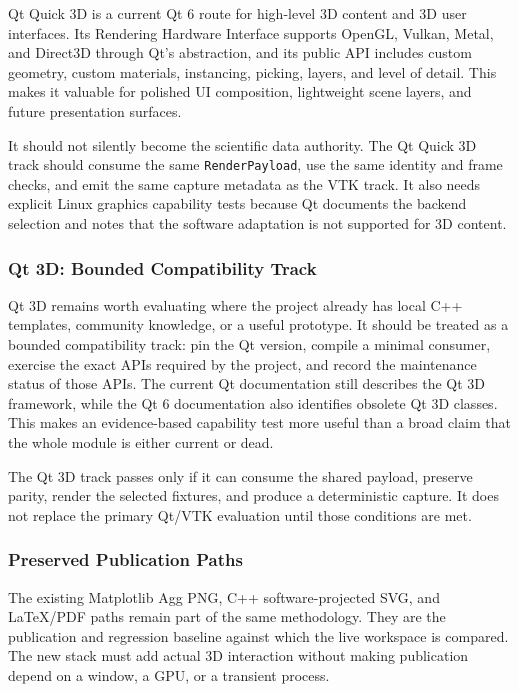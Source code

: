 \documentclass[11pt,a4paper]{article}
\begin{document}
Qt Quick 3D is a current Qt 6 route for high-level 3D content and 3D user
interfaces.  Its Rendering Hardware Interface supports OpenGL, Vulkan, Metal,
and Direct3D through Qt's abstraction, and its public API includes custom
geometry, custom materials, instancing, picking, layers, and level of detail.
This makes it valuable for polished UI composition, lightweight scene layers,
and future presentation surfaces.

It should not silently become the scientific data authority.  The Qt Quick 3D
track should consume the same \texttt{RenderPayload}, use the same identity and
frame checks, and emit the same capture metadata as the VTK track.  It also
needs explicit Linux graphics capability tests because Qt documents the
backend selection and notes that the software adaptation is not supported for
3D content.

\subsubsection{Qt 3D: Bounded Compatibility Track}

Qt 3D remains worth evaluating where the project already has local C++
templates, community knowledge, or a useful prototype.  It should be treated
as a bounded compatibility track: pin the Qt version, compile a minimal
consumer, exercise the exact APIs required by the project, and record the
maintenance status of those APIs.  The current Qt documentation still
describes the Qt 3D framework, while the Qt 6 documentation also identifies
obsolete Qt 3D classes.  This makes an evidence-based capability test more
useful than a broad claim that the whole module is either current or dead.

The Qt 3D track passes only if it can consume the shared payload, preserve
parity, render the selected fixtures, and produce a deterministic capture.  It
does not replace the primary Qt/VTK evaluation until those conditions are met.

\subsubsection{Preserved Publication Paths}

The existing Matplotlib Agg PNG, C++ software-projected SVG, and LaTeX/PDF
paths remain part of the same methodology.  They are the publication and
regression baseline against which the live workspace is compared.  The new
stack must add actual 3D interaction without making publication depend on a
window, a GPU, or a transient process.
\end{document}
